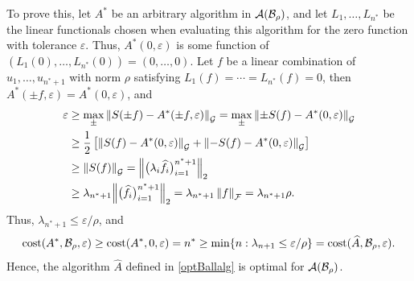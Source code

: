 \documentclass[graybox,footinfo]{svmult}
\newcommand{\DHJRnorm}[2][{}]{\ensuremath{\left \lVert #2 \right \rVert}_{#1}}
\newcommand{\DHJRBignorm}[2][{}]{\ensuremath{\Bigl \lVert #2 \Bigr \rVert}_{#1}}
\begin{document}
To prove this, let $A^*$ be an arbitrary algorithm in ${\mathcal{A}}({\mathcal{B}}_{\rho})$, and let $L_1, \ldots, L_{n^*}$ be the linear functionals chosen when evaluating this algorithm for the zero function with tolerance $\varepsilon$.  Thus, $A^*(0,\varepsilon)$ is some function of $(L_1(0) , \ldots, L_{n^*}(0)) = (0, \ldots, 0)$.  Let $f$ be a linear combination of $u_1, \ldots, u_{n^*+1}$ with norm $\rho$ satisfying  $L_1(f) = \cdots = L_{n^*}(f) = 0$, then $A^*(\pm f, \varepsilon) = A^*(0, \varepsilon)$, and
\begin{align*}
\varepsilon & \ge \max_{\pm} \DHJRnorm[\calG]{S(\pm f) - A^*(\pm f, \varepsilon)} =  \max_{\pm} \DHJRnorm[\calG]{\pm S( f) - A^*(0, \varepsilon)} \\
& \ge \frac 12 \left [ \DHJRnorm[\calG]{S( f) - A^*(0, \varepsilon)} + \DHJRnorm[\calG]{- S( f) - A^*(0, \varepsilon)}\right] \\
& \ge \DHJRnorm[\calG]{S(f)} 
= \DHJRBignorm[2]{\big(\lambda_i\widehat{f}_i\big)_{i=1}^{n^*+1}} \\
& \ge \lambda_{n^*+1} \DHJRBignorm[2]{\big(\widehat{f}_i\big)_{i=1}^{n^*+1}} = \lambda_{n^*+1} \DHJRnorm[\calF]{f} = \lambda_{n^*+1} \rho.
\end{align*}
Thus, $\lambda_{n^*+1} \le \varepsilon/\rho$, and 
\[
\textup{cost}(A^*,{\mathcal{B}}_\rho,\varepsilon) \ge \textup{cost}(A^*,0,\varepsilon)  = n^* \ge \min\{ n : \lambda_{n+1} \le \varepsilon/\rho \} = \textup{cost}(\widehat{A},{\mathcal{B}}_\rho,\varepsilon).
\]
Hence, the algorithm $\widehat{A}$ defined in \eqref{optBallalg} is optimal for ${\mathcal{A}}({\mathcal{B}}_{\rho})$.
\end{document}
